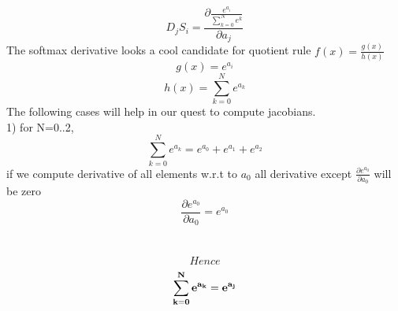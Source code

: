 \documentclass{article}
\begin{document}
\[ D_{j}S_{i}= \frac{\partial{\frac{e^{a_{i}}}{\sum_{k=0}^{N}e^k}}}{\partial{a_{j}}}\]
The softmax derivative looks a cool candidate for quotient rule $f(x)=\frac{g(x)}{h(x)}$
\[g(x)=e^{a_{i}}\]
\[h(x)=\sum_{k=0}^{N}{e^{a_{k}}}\]
The following cases will help in our quest to compute jacobians. \\

1) for N=0..2,
\[\sum_{k=0}^{N}{e^{a_{k}}}=e^{a_{0}}+e^{a_{1}}+e^{a_{2}}\]
	if we compute derivative of all elements w.r.t to $a_{0}$ all derivative except  $\frac{\partial{e^{a_{0}}}}{\partial{a_{0}}}$ will be zero 
\[\frac{\partial{e^{a_{0}}}}{\partial{a_{0}}}=e^{a_{0}}\]
\\
\\
\[Hence\]
\[\bf{\sum_{k=0}^{N}{e^{a_{k}}}=e^{a_{j}}}\]
\end{document}
